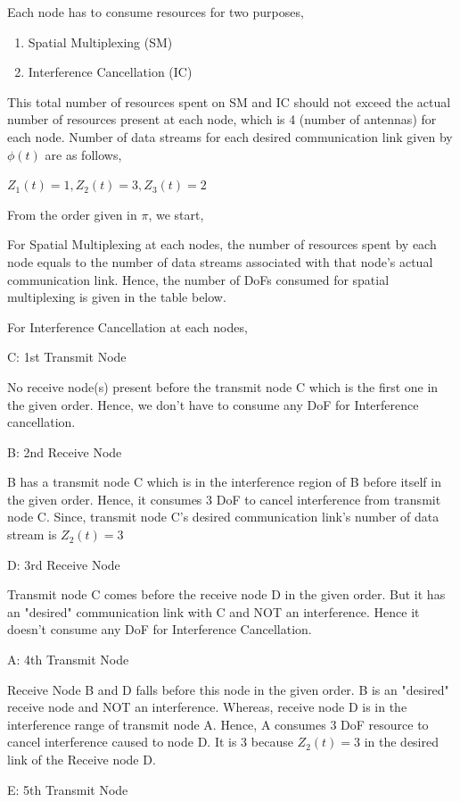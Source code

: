 \documentclass[a4paper,oneside,12pt]{report}
\begin{document}
\begin{enumerate} [(i)]
Each node has to consume resources for two purposes,
\begin{enumerate}
	\item Spatial Multiplexing (SM)
	\item Interference Cancellation (IC)
\end{enumerate}

This total number of resources spent on SM and IC should not exceed the actual number of resources present at each node, which is 4 (number of antennas) for each node. Number of data streams for each desired communication link given by $\phi(t)$ are as follows,

$Z_1(t) = 1, Z_2(t) = 3, Z_3(t) = 2$

From the order given in $\pi$, we start,

For Spatial Multiplexing at each nodes, the number of resources spent by each node equals to the number of data streams associated with that node's actual communication link. Hence, the number of DoFs consumed for spatial multiplexing is given in the table below.

For Interference Cancellation at each nodes,

C: 1st Transmit Node

No receive node(s) present before the transmit node C which is the first one in the given order. Hence, we don't have to consume any DoF for Interference cancellation.

B: 2nd Receive Node

B has a transmit node C which is in the interference region of B before itself in the given order. Hence, it consumes 3 DoF to cancel interference from transmit node C. Since, transmit node C's desired communication link's number of data stream is $Z_2(t) = 3$

D: 3rd Receive Node

Transmit node C comes before the receive node D in the given order. But it has an "desired" communication link with C and NOT an interference. Hence it doesn't consume any DoF for Interference Cancellation.

A: 4th Transmit Node

Receive Node B and D falls before this node in the given order. B is an "desired" receive node and NOT an interference. Whereas, receive node D is in the interference range of transmit node A. Hence, A consumes 3 DoF resource to cancel interference caused to node D. It is 3 because $Z_2(t) = 3$ in the desired link of the Receive node D.

E: 5th Transmit Node


\end{enumerate}
\end{document}
